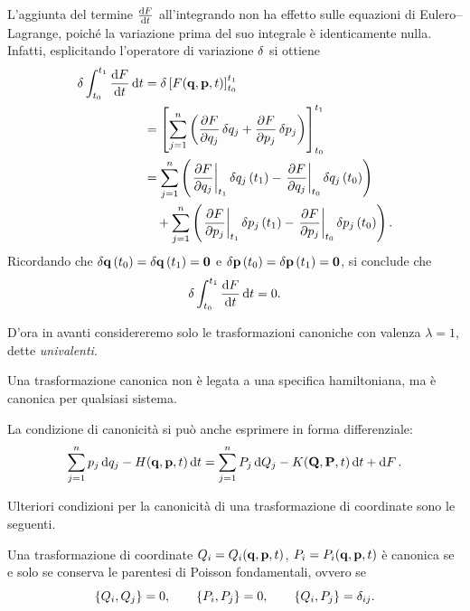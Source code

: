 L'aggiunta del termine $\dv{F}{t}$ all'integrando non ha effetto sulle equazioni di Eulero--Lagrange, poiché la variazione prima del suo integrale è identicamente nulla. Infatti, esplicitando l'operatore di variazione $\var$ si ottiene
\begin{align*}
    \var \int_{t_0}^{t_1} \dv{F}{t} \dd{t} &= \var \left[ F(\vb{q}, \vb{p}, t) \right]_{t_0}^{t_1} \\
    &= \left[ \sum_{j=1}^n \left(\pdv{F}{q_j} \var{q_j} + \pdv{F}{p_j} \var{p_j} \right) \right]_{t_0}^{t_1} \\
    &= \sum_{j=1}^n \left( \left. \pdv{F}{q_j} \right|_{t_1} \var{q_j}(t_1) - \left. \pdv{F}{q_j} \right|_{t_0} \var{q_j}(t_0) \right) \\
    &\quad + \sum_{j=1}^n \left( \left. \pdv{F}{p_j} \right|_{t_1} \var{p_j}(t_1) - \left. \pdv{F}{p_j} \right|_{t_0} \var{p_j}(t_0) \right).
\end{align*}
Ricordando che $\var{\vb{q}}(t_0) = \var{\vb{q}}(t_1) = \vb{0}$ e $\var{\vb{p}}(t_0) = \var{\vb{p}}(t_1) = \vb{0}$, si conclude che
\begin{equation*}
    \var \int_{t_0}^{t_1} \dv{F}{t} \dd{t} = 0.
\end{equation*}

D'ora in avanti considereremo solo le trasformazioni canoniche con valenza $\lambda = 1$, dette \emph{univalenti}.

\begin{remark}
    Una trasformazione canonica non è legata a una specifica hamiltoniana, ma è canonica per qualsiasi sistema.
\end{remark}

La condizione di canonicità si può anche esprimere in forma differenziale:
\begin{equation*}
    \sum_{j=1}^n p_j \dd{q_j} - H(\vb{q}, \vb{p}, t) \dd{t} = \sum_{j=1}^n P_j \dd{Q_j} - K(\vb{Q}, \vb{P}, t) \dd{t} + \dd{F}.
\end{equation*}

Ulteriori condizioni per la canonicità di una trasformazione di coordinate sono le seguenti.

\begin{proposition}
    Una trasformazione di coordinate $Q_i = Q_i(\vb{q}, \vb{p}, t)$, $P_i = P_i(\vb{q}, \vb{p}, t)$ è canonica se e solo se conserva le parentesi di Poisson fondamentali, ovvero se
    \begin{equation*}
        \pb{Q_i}{Q_j} = 0, \qquad \pb{P_i}{P_j} = 0, \qquad \pb{Q_i}{P_j} = \delta_{ij}.
    \end{equation*}
\end{proposition}

